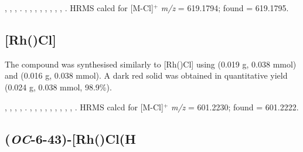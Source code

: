 ,
,
,
.
,
,
,
,
,
,
,
,
.
HRMS calcd for  [M-Cl]$^+$ \emph{m/z} = 619.1794; found = 619.1795.



\subsection*{[Rh(\tBuxantphosk)Cl]}


The compound was synthesised similarly to [Rh(\tBusixantphos)Cl] using \tBuxantphos{} (0.019 g, 0.038 mmol) and  (0.016 g, 0.038 mmol).  A dark red solid was obtained in quantitative yield (0.024 g, 0.038 mmol, 98.9\%).  

,
,
,
,
.
,
,
,
,
,
,
,
,
,
.
HRMS calcd for  [M-Cl]$^+$ \emph{m/z} = 601.2230; found = 601.2222.



\subsection*{(\emph{OC}-6-43)-\texorpdfstring{[Rh(\tBusixantphosk)Cl(H\ce{)2]}}R}

